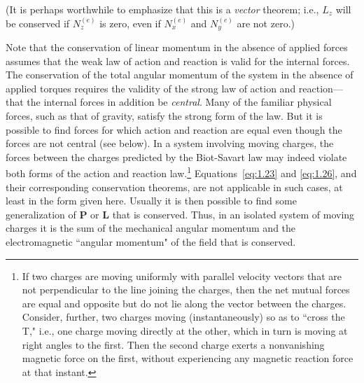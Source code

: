 (It is perhaps worthwhile to emphasize that this is a \emph{vector} theorem; i.e., \(L_z\) will be conserved if \(N_z^{\left(e\right)}\) is zero, even if \(N_x^{\left(e\right)}\) and \(N_y^{\left(e\right)}\) are not zero.)

Note that the conservation of linear momentum in the absence of applied forces assumes that the weak law of action and reaction is valid for the internal forces. The conservation of the total angular momentum of the system in the absence of applied torques requires the validity of the strong law of action and reaction—that the internal forces in addition be \emph{central}. Many of the familiar physical forces, such as that of gravity, satisfy the strong form of the law. But it is possible to find forces for which action and reaction are equal even though the forces are not central (see below). In a system involving moving charges, the forces between the charges predicted by the Biot-Savart law may indeed violate both forms of the action and reaction law.\footnote{If two charges are moving uniformly with parallel velocity vectors that are not perpendicular to the line joining the charges, then the net mutual forces are equal and opposite but do not lie along the vector between the charges. Consider, further, two charges moving (instantaneously) so as to ``cross the T," i.e., one charge moving directly at the other, which in turn is moving at right angles to the first. Then the second charge exerts a nonvanishing magnetic force on the first, without experiencing any magnetic reaction force at that instant.} Equations~\eqref{eq:1.23} and \eqref{eq:1.26}, and their corresponding conservation theorems, are not applicable in such cases, at least in the form given here. Usually it is then possible to find some generalization of \(\symbf{P}\) or \(\symbf{L}\) that is conserved. Thus, in an isolated system of moving charges it is the sum of the mechanical angular momentum and the electromagnetic ``angular momentum" of the field that is conserved.

